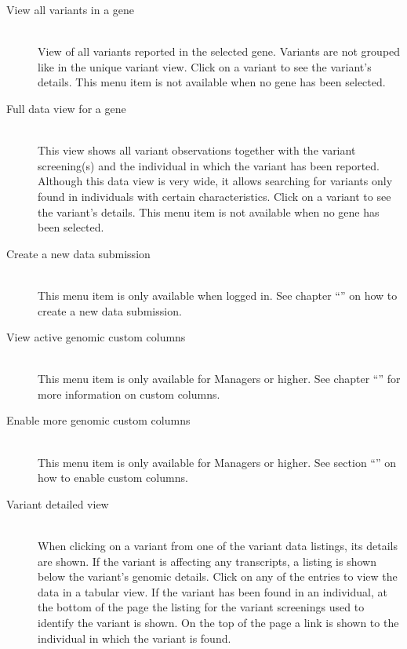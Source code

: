 \begin{description}
  \item [View all variants in a gene] \hfill \\
  View of all variants reported in the selected gene.
  Variants are not grouped like in the unique variant view.
  Click on a variant to see the variant's details.
  This menu item is not available when no gene has been selected.
  \item [Full data view for a gene] \hfill \\
  This view shows all variant observations together with the variant screening(s)
   and the individual in which the variant has been reported.
  Although this data view is very wide,
   it allows searching for variants only found in individuals with certain characteristics.
  Click on a variant to see the variant's details.
  This menu item is not available when no gene has been selected.
  \item [Create a new data submission] \hfill \\
  This menu item is only available when logged in.
  See chapter ``'' on how to create a new data submission.
  \item [View active genomic custom columns] \hfill \\
  This menu item is only available for Managers or higher.
  See chapter ``'' for more information on custom columns.
  \item [Enable more genomic custom columns] \hfill \\
  This menu item is only available for Managers or higher.
  See section ``'' on how to enable custom columns.
  \item [Variant detailed view] \hfill \\
  When clicking on a variant from one of the variant data listings, its details are shown.
  If the variant is affecting any transcripts, a listing is shown below the variant's genomic details.
  Click on any of the entries to view the data in a tabular view.
  If the variant has been found in an individual,
   at the bottom of the page the listing for the variant screenings used to identify the variant is shown.
  On the top of the page a link is shown to the individual in which the variant is found.
\end{description}





